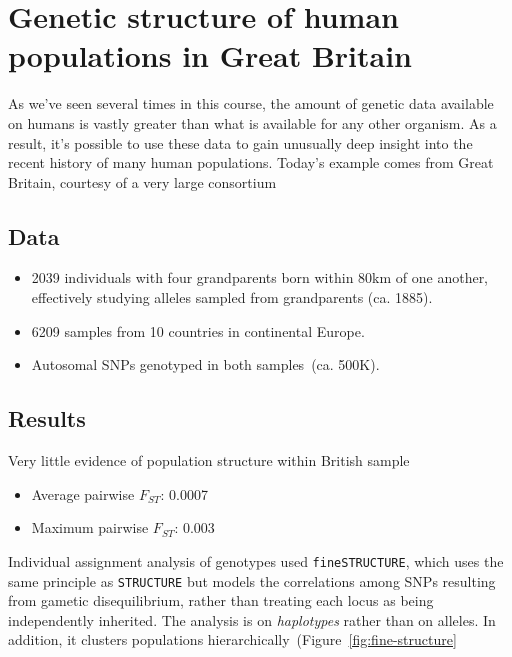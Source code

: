 \section*{Genetic structure of human populations in Great Britain}

As we've seen several times in this course, the amount of genetic data
available on humans is vastly greater than what is available for any
other organism. As a result, it's possible to use these data to gain
unusually deep insight into the recent history of many human
populations. Today's example comes from Great Britain, courtesy of a
very large consortium~\cite{Leslie-etal-2015}

\subsection*{Data}

\begin{itemize}

\item 2039 individuals with four grandparents born within 80km of one
  another, effectively studying alleles sampled from grandparents
  (ca. 1885). 

\item 6209 samples from 10 countries in continental Europe.

\item Autosomal SNPs genotyped in both samples~(ca. 500K). 

\end{itemize}

\subsection*{Results}

Very little evidence of population structure within British sample

\begin{itemize}

\item Average pairwise $F_{ST}$: 0.0007

\item Maximum pairwise $F_{ST}$: 0.003

\end{itemize}

Individual assignment analysis of genotypes used {\tt fineSTRUCTURE},
which uses the same principle as {\tt STRUCTURE} but models the
correlations among SNPs resulting from gametic disequilibrium, rather
than treating each locus as being independently inherited. The
analysis is on {\it haplotypes\/} rather than on alleles. In addition,
it clusters populations
hierarchically~(Figure~\ref{fig:fine-structure}

